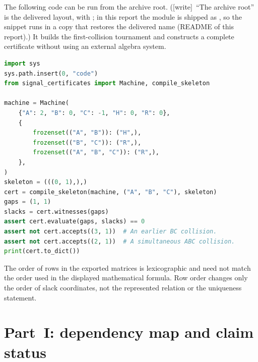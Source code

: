 \documentclass[11pt,letterpaper]{article}
\numberwithin{equation}{section}
\theoremstyle{definition}
\theoremstyle{remark}
\newcommand{\wtag}{\textup{[write]}}
\begin{document}
The following code can be run from the archive root. (\wtag\ ``The archive root'' is the delivered layout, with ; in this report the module is shipped as , so the snippet runs in a copy that restores the delivered name (README of this report).) It builds the
first-collision tournament and constructs a complete certificate without
using an external algebra system.
\begin{lstlisting}[language=Python]
import sys
sys.path.insert(0, "code")
from signal_certificates import Machine, compile_skeleton

machine = Machine(
    {"A": 2, "B": 0, "C": -1, "H": 0, "R": 0},
    {
        frozenset(("A", "B")): ("H",),
        frozenset(("B", "C")): ("R",),
        frozenset(("A", "B", "C")): ("R",),
    },
)
skeleton = (((0, 1),),)
cert = compile_skeleton(machine, ("A", "B", "C"), skeleton)
gaps = (1, 1)
slacks = cert.witnesses(gaps)
assert cert.evaluate(gaps, slacks) == 0
assert not cert.accepts((3, 1))  # An earlier BC collision.
assert not cert.accepts((2, 1))  # A simultaneous ABC collision.
print(cert.to_dict())
\end{lstlisting}
The order of rows in the exported matrices is lexicographic and need not
match the order used in the displayed mathematical formula. Row order
changes only the order of slack coordinates, not the represented relation
or the uniqueness statement.

\section{Part~I: dependency map and claim status}\label{smc:cg:app:dependency}
\end{document}
